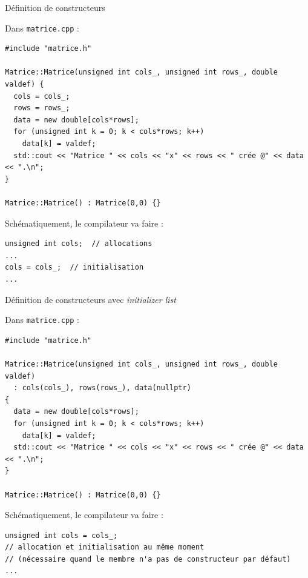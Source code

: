\documentclass[c]{beamer}
\begin{document}

\begin{frame}[fragile]{Définition de constructeurs}

Dans \texttt{matrice.cpp} :

\begin{verbatim}
#include "matrice.h"

Matrice::Matrice(unsigned int cols_, unsigned int rows_, double valdef) {
  cols = cols_;
  rows = rows_;
  data = new double[cols*rows];
  for (unsigned int k = 0; k < cols*rows; k++)
    data[k] = valdef;
  std::cout << "Matrice " << cols << "x" << rows << " crée @" << data << ".\n";
}

Matrice::Matrice() : Matrice(0,0) {}
\end{verbatim}

\vspace{1em}
Schématiquement, le compilateur va faire :
\begin{verbatim}
unsigned int cols;  // allocations
...
cols = cols_;  // initialisation
...
\end{verbatim}

\end{frame}


\begin{frame}[fragile]{Définition de constructeurs avec \textit{initializer list}}

Dans \texttt{matrice.cpp} :

\begin{verbatim}
#include "matrice.h"

Matrice::Matrice(unsigned int cols_, unsigned int rows_, double valdef) 
  : cols(cols_), rows(rows_), data(nullptr)
{
  data = new double[cols*rows];
  for (unsigned int k = 0; k < cols*rows; k++)
    data[k] = valdef;
  std::cout << "Matrice " << cols << "x" << rows << " crée @" << data << ".\n";
}

Matrice::Matrice() : Matrice(0,0) {}
\end{verbatim}

\vspace{1em}
Schématiquement, le compilateur va faire :
\begin{verbatim}
unsigned int cols = cols_;
// allocation et initialisation au même moment
// (nécessaire quand le membre n'a pas de constructeur par défaut)
...
\end{verbatim}

\end{frame}
\end{document}
